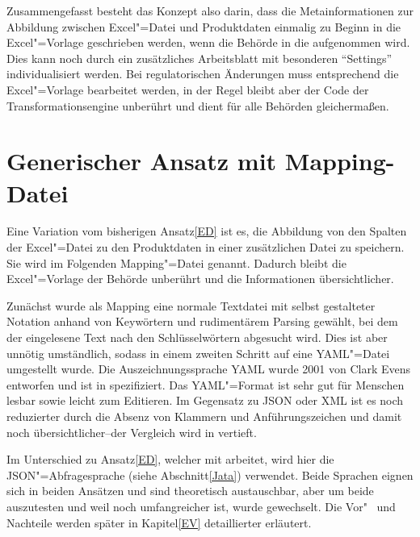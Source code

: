 Zusammengefasst besteht das Konzept also darin, dass die Metainformationen zur Abbildung zwischen Excel"=Datei und Produktdaten einmalig zu Beginn in die Excel"=Vorlage geschrieben werden, wenn die Behörde in die  aufgenommen wird. Dies kann noch durch ein zusätzliches Arbeitsblatt mit besonderen "`Settings"' individualisiert werden. 
Bei regulatorischen Änderungen muss entsprechend die Excel"=Vorlage bearbeitet werden, in der Regel bleibt aber der Code der Transformationsengine unberührt und dient für alle Behörden gleichermaßen.




\section{Generischer Ansatz mit Mapping-Datei} \label{MD}

Eine Variation vom bisherigen Ansatz\nbs\ref{ED} ist es, die Abbildung von den Spalten der Excel"=Datei zu den Produktdaten in einer zusätzlichen Datei zu speichern. Sie wird im Folgenden Mapping"=Datei genannt. Dadurch bleibt die Excel"=Vorlage der Behörde unberührt und die Informationen übersichtlicher. 

Zunächst wurde als Mapping eine normale Textdatei mit selbst gestalteter Notation anhand von Keywörtern und rudimentärem Parsing gewählt, bei dem der eingelesene Text nach den Schlüsselwörtern abgesucht wird. Dies ist aber unnötig umständlich, sodass in einem zweiten Schritt auf eine YAML"=Datei umgestellt wurde. Die Auszeichnungssprache YAML wurde 2001 von Clark Evens entworfen und ist in\nbs\cite{yaml} spezifiziert. Das YAML"=Format ist sehr gut für Menschen lesbar sowie leicht zum Editieren. Im Gegensatz zu JSON oder XML ist es noch reduzierter durch die Absenz von Klammern und Anführungszeichen und damit noch übersichtlicher\nbs --\nbs der Vergleich wird in\nbs\cite{json:yaml} vertieft.

Im Unterschied zu Ansatz\nbs\ref{ED}, welcher mit  arbeitet, wird hier die JSON"=Abfragesprache  (siehe Abschnitt\nbs\ref{Jata}) verwendet. Beide Sprachen eignen sich in beiden Ansätzen und sind theoretisch austauschbar, aber um beide auszutesten und weil  noch umfangreicher ist, wurde gewechselt. Die Vor"~ und Nachteile werden später in Kapitel\nbs\ref{EV} detaillierter erläutert. 

